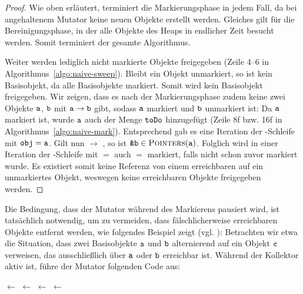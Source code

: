 \begin{proof}
	Wie oben erläutert, terminiert die Markierungsphase in jedem Fall, da bei angehaltenem Mutator keine neuen Objekte erstellt werden.
	Gleiches gilt für die Bereinigungsphase, in der alle Objekte des Heaps in endlicher Zeit besucht werden.
	Somit terminiert der gesamte Algorithmus.
	
	Weiter werden lediglich nicht markierte Objekte freigegeben (Zeile 4--6 in Algorithmus~\ref{algo:naive-sweep}).
	Bleibt ein Objekt  unmarkiert, so ist  kein Basisobjekt, da  alle Basisobjekte markiert.
	Somit wird kein Basisobjekt freigegeben.
	Wir zeigen, dass es nach der Markierungsphase zudem keine zwei Objekte $\texttt{a}$, $\texttt{b}$ mit $\texttt{a} \rightarrow \texttt{b}$ gibt, sodass $\texttt{a}$ markiert und $\texttt{b}$ unmarkiert ist:
	Da $\texttt{a}$ markiert ist, wurde $\texttt{a}$ auch der Menge $\texttt{toDo}$ hinzugefügt (Zeile 8f bzw. 16f in Algorithmus~\ref{algo:naive-mark}).
	Entsprechend gab es eine Iteration der \WHILE-Schleife mit $\texttt{obj} = \texttt{a}$.
	Gilt nun  $\rightarrow$ , so ist $\texttt{\&b} \in \textsc{Pointers}(\texttt{a})$.
	Folglich wird in einer Iteration der \FOREACH-Schleife mit  $=$  auch  $=$  markiert, falls  nicht schon zuvor markiert wurde.
	Es existiert somit keine Referenz von einem erreichbaren auf ein unmarkiertes Objekt, weswegen keine erreichbaren Objekte freigegeben werden.
\end{proof}

Die Bedingung, dass der Mutator während des Markierens pausiert wird, ist tatsächlich notwendig, um zu vermeiden, dass fälschlicherweise erreichbaren Objekte entfernt werden, wie folgendes Beispiel zeigt (vgl. \cite[969]{dijkstra1978}):
Betrachten wir etwa die Situation, dass zwei Basisobjekte $\texttt{a}$ und $\texttt{b}$ alternierend auf ein Objekt $\texttt{c}$ verweisen, das ausschließlich über $\texttt{a}$ oder $\texttt{b}$ erreichbar ist.
Während der Kollektor aktiv ist, führe der Mutator folgenden Code aus:

\begin{center}
\begin{minipage}{0.3\textwidth}
	\centering
	\begin{algorithmic}[1]
		\State {} $\gets$ 
		\State {} $\gets$ \Null
		\State {} $\gets$ 
		\State {} $\gets$ \Null
	\end{algorithmic}
\end{minipage}~
\begin{minipage}{0.3\textwidth}
	\centering
	
\end{minipage}~
\begin{minipage}{0.3\textwidth}
	\centering
	
\end{minipage}
\end{center}

